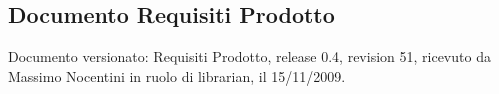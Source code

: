 \subsection{Documento Requisiti Prodotto}
Documento versionato: Requisiti Prodotto, release 0.4, revision 51, ricevuto da
Massimo Nocentini in ruolo di librarian, il 15/11/2009.